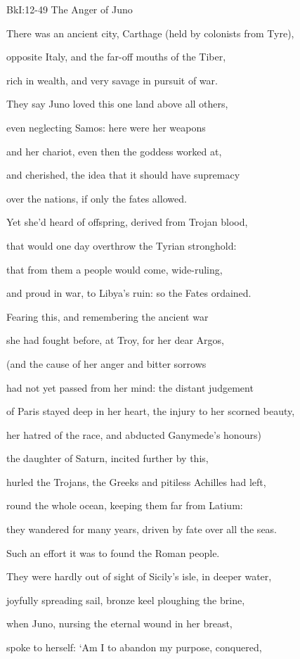 \documentclass[10pt, a4paper, titlepage]{article}
\begin{document}
BkI:12-49 The Anger of Juno

There was an ancient city, Carthage (held by colonists from Tyre),

opposite Italy, and the far-off mouths of the Tiber,

rich in wealth, and very savage in pursuit of war.

They say Juno loved this one land above all others,

even neglecting Samos: here were her weapons

and her chariot, even then the goddess worked at,

and cherished, the idea that it should have supremacy

over the nations, if only the fates allowed.

Yet she’d heard of offspring, derived from Trojan blood,

that would one day overthrow the Tyrian stronghold:

that from them a people would come, wide-ruling,

and proud in war, to Libya’s ruin: so the Fates ordained.

Fearing this, and remembering the ancient war

she had fought before, at Troy, for her dear Argos,

(and the cause of her anger and bitter sorrows

had not yet passed from her mind: the distant judgement

of Paris stayed deep in her heart, the injury to her scorned beauty,

her hatred of the race, and abducted Ganymede’s honours)

the daughter of Saturn, incited further by this,

hurled the Trojans, the Greeks and pitiless Achilles had left,

round the whole ocean, keeping them far from Latium:

they wandered for many years, driven by fate over all the seas.

Such an effort it was to found the Roman people.

They were hardly out of sight of Sicily’s isle, in deeper water,

joyfully spreading sail, bronze keel ploughing the brine,

when Juno, nursing the eternal wound in her breast,

spoke to herself: ‘Am I to abandon my purpose, conquered,
\end{document}
